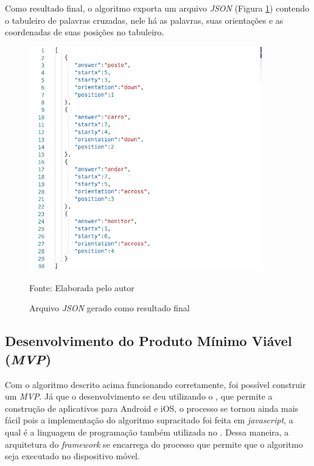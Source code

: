Como resultado final, o algoritmo exporta um arquivo \textit{JSON} (Figura \ref{fig:json}) contendo o tabuleiro de palavras cruzadas, nele há as palavras, suas orientações e as coordenadas de suas posições no tabuleiro.

\begin{figure}[H]
\centering
    \caption{Arquivo \textit{JSON} gerado como resultado final}
    \label{fig:json}
    \includegraphics[width=0.9\textwidth]{Figuras/codeJSONresult.png}
    
    Fonte: Elaborada pelo autor
\end{figure}

\subsection{Desenvolvimento do Produto Mínimo Viável (\textit{MVP})}
Com o algoritmo descrito acima funcionando corretamente, foi possível construir um \textit{MVP}. Já que o desenvolvimento se deu utilizando o \cite{RN}, que permite a construção de aplicativos para Android e iOS, o processo se tornou ainda mais fácil pois a implementação do algoritmo supracitado foi feita em \textit{javascript}, a qual é a linguagem de programação também utilizada no \cite{RN}. Dessa maneira, a arquitetura do \textit{framework} se encarrega do processo que permite que o algoritmo seja executado no dispositivo móvel.

